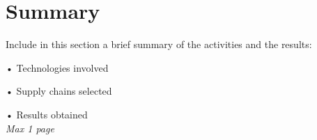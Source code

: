 \tableofcontents
\newpage
\chapter*{Summary}
Include in this section a brief summary of the activities and the results:

•	Technologies involved

•	Supply chains selected

•	Results obtained\\
\textit{Max 1 page}
